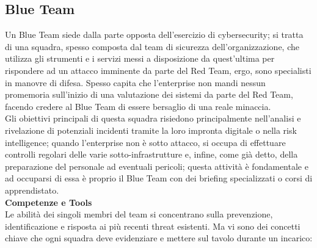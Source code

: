     \subsection{Blue Team\label{blue}}
    Un Blue Team siede dalla parte opposta dell'esercizio di cybersecurity; si tratta di una squadra, spesso composta dal team di sicurezza dell'organizzazione, che utilizza gli strumenti e i servizi messi a disposizione da quest'ultima per rispondere ad un attacco imminente da parte del Red Team, ergo, sono specialisti in manovre di difesa. Spesso capita che l'enterprise non mandi nessun promemoria sull'inizio di una valutazione dei sistemi da parte del Red Team, facendo credere al Blue Team di essere bersaglio di una reale minaccia.\\
    Gli obiettivi principali di questa squadra risiedono principalmente nell'analisi e rivelazione di potenziali incidenti tramite la loro impronta digitale o nella risk intelligence; quando l'enterprise non è sotto attacco, si occupa di effettuare controlli regolari delle varie sotto-infrastrutture e, infine, come già detto, della preparazione del personale ad eventuali pericoli; questa attività è fondamentale e ad occuparsi di essa è proprio il Blue Team con dei briefing specializzati o corsi di apprendistato.\cite{blue_team}\\[1.5em]
    {\bfseries\Large{Competenze e Tools}}\\[2em]
    Le abilità dei singoli membri del team si concentrano sulla prevenzione, identificazione e risposta ai più recenti threat esistenti. Ma vi sono dei concetti chiave che ogni squadra deve evidenziare e mettere sul tavolo durante un incarico:
